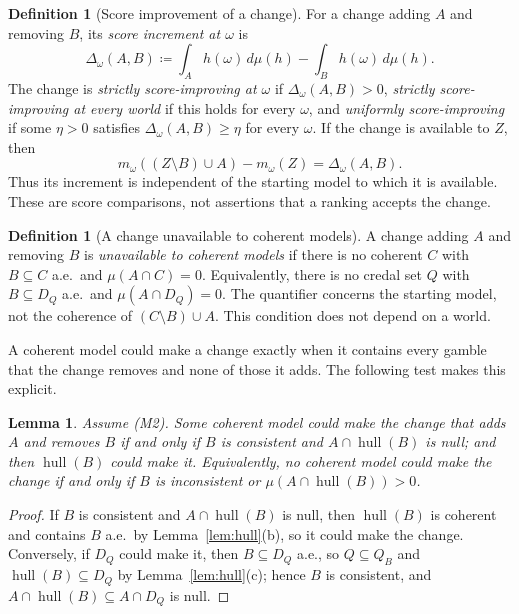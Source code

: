 \documentclass[11pt]{article}
\newcommand{\hull}{\operatorname{hull}}
\theoremstyle{plain}
\newtheorem{lemma}[theorem]{Lemma}
\theoremstyle{definition}
\newtheorem{definition}[theorem]{Definition}
\theoremstyle{remark}
\begin{document}
\begin{definition}[Score improvement of a change]\label{def:score-improvement}
For a change adding $A$ and removing $B$, its \emph{score increment at $\omega$} is
\[
\Delta_\omega(A,B)\coloneqq\int_A h(\omega)\,d\mu(h)-\int_B h(\omega)\,d\mu(h).
\]
The change is \emph{strictly score-improving at $\omega$} if $\Delta_\omega(A,B)>0$,
\emph{strictly score-improving at every world} if this holds for every $\omega$, and
\emph{uniformly score-improving} if some $\eta>0$ satisfies
$\Delta_\omega(A,B)\ge\eta$ for every $\omega$.
If the change is available to $Z$, then
\[
m_\omega((Z\setminus B)\cup A)-m_\omega(Z)=\Delta_\omega(A,B).
\]
Thus its increment is independent of the starting model to which it is available.
These are score comparisons, not assertions that a ranking accepts the change.
\end{definition}

\begin{definition}[A change unavailable to coherent models]\label{def:unavailable}
A change adding $A$ and removing $B$ is \emph{unavailable to coherent models} if there is
no coherent $C$ with $B\subseteq C$ a.e.\ and $\mu(A\cap C)=0$.
Equivalently, there is no credal set $Q$ with $B\subseteq D_Q$ a.e.\ and
$\mu(A\cap D_Q)=0$. The quantifier concerns the starting model, not the coherence of
$(C\setminus B)\cup A$. This condition does not depend on a world.
\end{definition}

A coherent model could make a change exactly when it contains every gamble that the change
removes and none of those it adds. The following test makes this explicit.

\begin{lemma}\label{lem:test}
Assume (M2). Some coherent model could make the change that adds $A$ and removes $B$ if and
only if $B$ is consistent and $A\cap\hull(B)$ is null; and then $\hull(B)$ could make it.
Equivalently, no coherent model could make the change if and only if $B$ is inconsistent or
$\mu(A\cap\hull(B))>0$.
\end{lemma}

\begin{proof}
If $B$ is consistent and $A\cap\hull(B)$ is null, then $\hull(B)$ is coherent and contains
$B$ a.e.\ by Lemma~\ref{lem:hull}(b), so it could make the change. Conversely, if $D_Q$ could
make it, then $B\subseteq D_Q$ a.e., so $Q\subseteq Q_B$ and $\hull(B)\subseteq D_Q$ by
Lemma~\ref{lem:hull}(c); hence $B$ is consistent, and $A\cap\hull(B)\subseteq A\cap D_Q$ is
null.
\end{proof}
\end{document}
